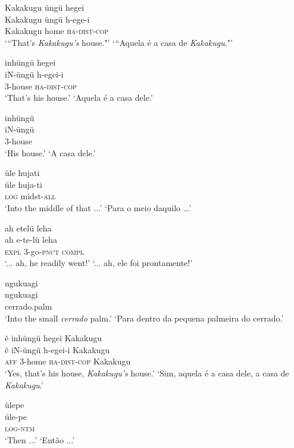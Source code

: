 \documentclass[output=paper,
modfonts,nonflat
]{langsci/langscibook}
\begin{document}
\ea  Kakakugu üngü hegei\\[.3em]
\gll Kakakugu üngü h-ege-i\\
     Kakakugu home \textsc{ha}-\textsc{dist}-\textsc{cop}\\
\glt ‘“That's \textit{Kakakugu's} house."’
\glt ‘“Aquela é a casa de \textit{Kakakugu}."’
\z

\ea  inhüngü hegei\\[.3em]
\gll iN-üngü h-egei-i\\
     3-house \textsc{ha}-\textsc{dist}-\textsc{cop}\\
\glt ‘That's his house.’
\glt ‘Aquela é a casa dele.’
\z

\ea  inhüngü\\[.3em]
\gll iN-üngü\\
     3-house\\
\glt ‘His house.’
\glt ‘A casa dele.’
\z

\ea  üle hujati\\[.3em]
\gll üle huja-ti\\
     \textsc{log} midst-\textsc{all}\\
\glt ‘Into the middle of that ...’
\glt ‘Para o meio daquilo ...’
\z

\newpage 
\ea  ah etelü leha\\[.3em]
\gll ah e-te-lü leha\\
     \textsc{expl} 3-go-\textsc{pnct} \textsc{compl}\\
\glt ‘... ah, he readily went!’
\glt ‘... ah, ele foi prontamente!’
\z

\ea  ngukuagi\\[.3em]
\gll ngukuagi\\
     cerrado.palm\\
\glt ‘Into the small \textit{cerrado} palm.’
\glt ‘Para dentro da pequena palmeira do cerrado.’
\z

\ea  ẽ inhüngü hegei Kakakugu\\[.3em]
\gll ẽ iN-üngü h-egei-i Kakakugu\\
     \textsc{aff} 3-home \textsc{ha}-\textsc{dist}-\textsc{cop} Kakakugu\\
\glt ‘Yes, that's his house, \textit{Kakakugu's} house.’
\glt ‘Sim, aquela é a casa dele, a casa de \textit{Kakakugu}.’
\z

\ea  ülepe\\[.3em]
\gll üle-pe\\
     \textsc{log}-\textsc{ntm}\\
\glt ‘Then ...’
\glt ‘Então ...’
\z
\end{document}
